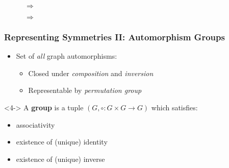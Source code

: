 \documentclass{beamer}
\begin{document}
\begin{frame}
{\begin{figure}
\begin{subfigure}{.2\paperwidth}
        \centering
      \end{subfigure}
      \Large$\Rightarrow$\normalsize
      \begin{subfigure}{.2\paperwidth}
        \centering
      \end{subfigure}
      \Large$\Rightarrow$\normalsize
    \end{figure}
  }
\end{frame}

\begin{frame}
  \frametitle{Representing Symmetries II: Automorphism Groups}

  \begin{itemize}
    \item Set of \textit{all} graph automorphisms:
      \begin{itemize}
        \item<2-> Closed under \textit{composition} and \textit{inversion}
        \item<3-> Representable by \textit{permutation group}
      \end{itemize}
  \end{itemize}

  \begin{definition}<4->
    A \textbf{group} is a tuple $(G, \circ: G \times G \rightarrow G)$ which
    satisfies:
    \begin{itemize}
      \item associativity
      \item existence of (unique) identity
      \item existence of (unique) inverse
    \end{itemize}
  \end{definition}
\end{frame}
\end{document}
